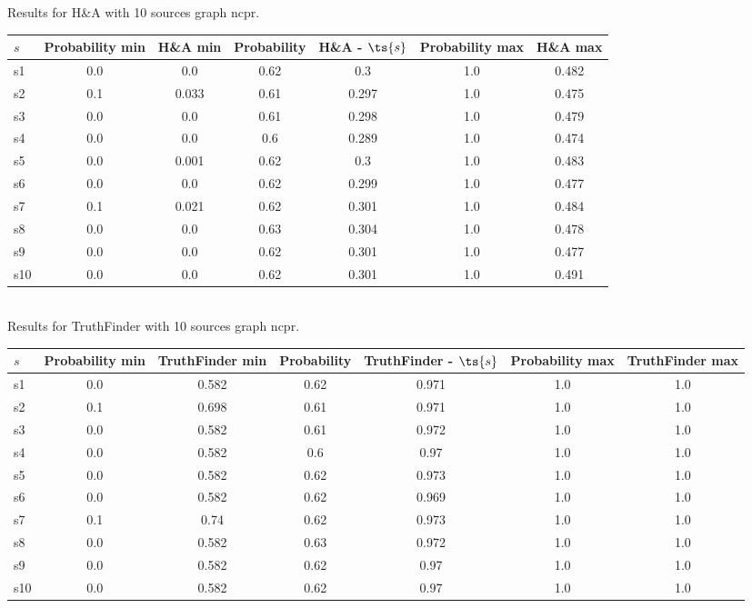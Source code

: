 \documentclass{article}
\begin{document}
\noindent Results for H\&A with 10 sources graph ncpr.

\noindent\begin{tabular}{|l|c|c|c|c|c|c|}
\hline
$s$& Probability min & H\&A min & Probability & H\&A - $\ts{s}$ & Probability max & H\&A max\\
\hline
s1 &0.0 & 0.0 & 0.62 & 0.3 & 1.0 & 0.482\\
\hline
s2 &0.1 & 0.033 & 0.61 & 0.297 & 1.0 & 0.475\\
\hline
s3 &0.0 & 0.0 & 0.61 & 0.298 & 1.0 & 0.479\\
\hline
s4 &0.0 & 0.0 & 0.6 & 0.289 & 1.0 & 0.474\\
\hline
s5 &0.0 & 0.001 & 0.62 & 0.3 & 1.0 & 0.483\\
\hline
s6 &0.0 & 0.0 & 0.62 & 0.299 & 1.0 & 0.477\\
\hline
s7 &0.1 & 0.021 & 0.62 & 0.301 & 1.0 & 0.484\\
\hline
s8 &0.0 & 0.0 & 0.63 & 0.304 & 1.0 & 0.478\\
\hline
s9 &0.0 & 0.0 & 0.62 & 0.301 & 1.0 & 0.477\\
\hline
s10 &0.0 & 0.0 & 0.62 & 0.301 & 1.0 & 0.491\\
\hline
\end{tabular}\\

\noindent Results for TruthFinder with 10 sources graph ncpr.

\noindent\begin{tabular}{|l|c|c|c|c|c|c|}
\hline
$s$& Probability min & TruthFinder min & Probability & TruthFinder - $\ts{s}$ & Probability max & TruthFinder max\\
\hline
s1 &0.0 & 0.582 & 0.62 & 0.971 & 1.0 & 1.0\\
\hline
s2 &0.1 & 0.698 & 0.61 & 0.971 & 1.0 & 1.0\\
\hline
s3 &0.0 & 0.582 & 0.61 & 0.972 & 1.0 & 1.0\\
\hline
s4 &0.0 & 0.582 & 0.6 & 0.97 & 1.0 & 1.0\\
\hline
s5 &0.0 & 0.582 & 0.62 & 0.973 & 1.0 & 1.0\\
\hline
s6 &0.0 & 0.582 & 0.62 & 0.969 & 1.0 & 1.0\\
\hline
s7 &0.1 & 0.74 & 0.62 & 0.973 & 1.0 & 1.0\\
\hline
s8 &0.0 & 0.582 & 0.63 & 0.972 & 1.0 & 1.0\\
\hline
s9 &0.0 & 0.582 & 0.62 & 0.97 & 1.0 & 1.0\\
\hline
s10 &0.0 & 0.582 & 0.62 & 0.97 & 1.0 & 1.0\\
\hline
\end{tabular}\\
\end{document}
